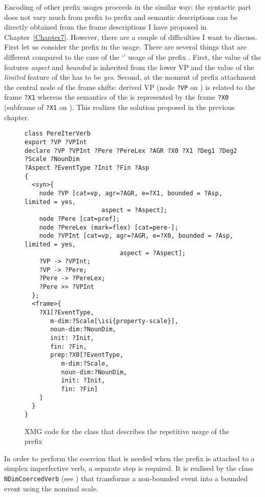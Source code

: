 Encoding of other prefix usages proceeds in the similar way: the syntactic part does not vary much from prefix to prefix and semantic descriptions can be directly obtained from the frame descriptions I have proposed in Chapter~\ref{Chapter7}. However, there are a couple of difficulties I want to discuss. First let us consider the prefix  in the  usage. There are several things that are different compared to the case of the `' usage of the prefix . First, the value of the features \textit{aspect} and \textit{bounded} is inherited from the  lower VP and the value of the \textit{limited} feature of the  has to be \textit{yes}. Second, at the moment of prefix attachment the central node of the frame shifts: derived VP (node \texttt{?VP} on ) is related to the frame \texttt{?X1} whereas the semantics of the  is represented by the frame \texttt{?X0} (subframe of \texttt{?X1} on ). This realizes the solution proposed in the previous chapter. 

\begin{figure}
\begin{lstlisting}[style=xmg]
class PereIterVerb
export ?VP ?VPInt 
declare ?VP ?VPInt ?Pere ?PereLex ?AGR ?X0 ?X1 ?Deg1 ?Deg2 ?Scale ?NounDim
?Aspect ?EventType ?Init ?Fin ?Asp
{
  <syn>{
    node ?VP [cat=vp, agr=?AGR, e=?X1, bounded = ?Asp, limited = yes, 
    				 aspect = ?Aspect];
    node ?Pere [cat=pref];
    node ?PereLex (mark=flex) [cat=pere-];
    node ?VPInt [cat=vp, agr=?AGR, e=?X0, bounded = ?Asp, limited = yes, 
    					  aspect = ?Aspect];
    ?VP -> ?VPInt;
    ?VP -> ?Pere;
    ?Pere -> ?PereLex;
    ?Pere >> ?VPInt
  };
  <frame>{
    ?X1[?EventType,
       m-dim:?Scale[\isi{property-scale}],
       noun-dim:?NounDim,
       init: ?Init,
       fin: ?Fin,
       prep:?X0[?EventType,
          m-dim:?Scale,
          noun-dim:?NounDim,
          init: ?Init,
          fin: ?Fin]
    ]
  }
}
\end{lstlisting}
\caption{XMG code for the class that describes the repetitive usage of the prefix \label{code:pere}}
\end{figure}

In order to perform the coercion that is needed when the prefix  is attached to a simplex imperfective verb, a separate step is required. It is realised by the class \texttt{NDimCoercedVerb} (see ) that transforms a non-bounded event into a bounded event using the nominal scale.

